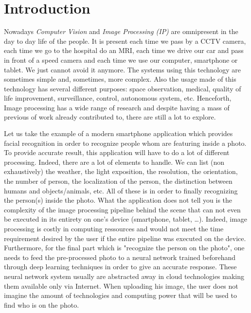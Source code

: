 \chapter*{Introduction}
\label{introduction.chap.introduction}

Nowadays \emph{Computer Vision} and \emph{Image Processing (IP)} are omnipresent in the day to day life of the people.
It is present each time we pass by a CCTV camera, each time we go to the hospital do an MRI, each time we drive our car
and pass in front of a speed camera and each time we use our computer, smartphone or tablet. We just cannot avoid it
anymore. The systems using this technology are sometimes simple and, sometimes, more complex. Also the usage made of
this technology has several different purposes: space observation, medical, quality of life improvement, surveillance,
control, autonomous system, etc. Henceforth, Image processing has a wide range of research and despite having a mass of
previous of work already contributed to, there are still a lot to explore.

Let us take the example of a modern smartphone application which provides facial recognition in order to recognize
people whom are featuring inside a photo. To provide accurate result, this application will have to do a lot of
different processing. Indeed, there are a lot of elements to handle. We can list (non exhaustively) the weather, the
light exposition, the resolution, the orientation, the number of person, the localization of the person, the distinction
between humans and objects/animals, etc. All of these is in order to finally recognizing the person(s) inside the photo.
What the application does not tell you is the complexity of the image processing pipeline behind the scene that can not
even be executed in its entirety on one's device (smartphone, tablet, \ldots). Indeed, image processing is costly in
computing ressources and would not meet the time requirement desired by the user if the entire pipeline was executed on
the device. Furthermore, for the final part which is "recognize the person on the photo", one needs to feed the
pre-processed photo to a neural network trained beforehand through deep learning techniques in order to give an accurate
response. These neural network system usually are abstracted away in cloud technologies making them available only via
Internet. When uploading his image, the user does not imagine the amount of technologies and computing power that will
be used to find who is on the photo.

